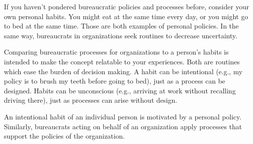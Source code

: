 
If you haven't pondered bureaucratic policies and processes before, consider your own personal habits. You might eat at the same time every day, or you might go to bed at the same time. Those are both examples of personal policies. In the same way, bureaucrats in organizations seek routines to decrease uncertainty. 

Comparing bureaucratic processes for organizations to a person's habits is intended to make the concept relatable to your experiences. Both are routines which ease the burden of decision making. A habit can be intentional (e.g., my policy is to brush my teeth before going to bed), just as a process can be designed. Habits can be unconscious (e.g., arriving at work without recalling driving there), just as processes can arise without design. 

An intentional habit of an individual person is motivated by a personal policy. Similarly, bureaucrats acting on behalf of an organization apply processes that support the policies of the organization.

